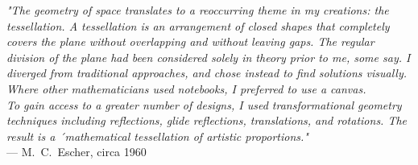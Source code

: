 \begin{flushright}
\emph{"The geometry of space translates to a reoccurring theme in my creations: the tessellation. A tessellation is an arrangement of closed shapes that completely covers the plane without overlapping and without leaving gaps. The regular division of the plane had been considered solely in theory prior to me, some say. I diverged from traditional approaches, and chose instead to find solutions visually. Where other mathematicians used notebooks, I preferred to use a canvas.\\
To gain access to a greater number of designs, I used transformational geometry techniques including reflections, glide reflections, translations, and rotations. The result is a ´mathematical tessellation of artistic proportions."}\\
 — M.~C.~Escher, circa 1960
\end{flushright}
